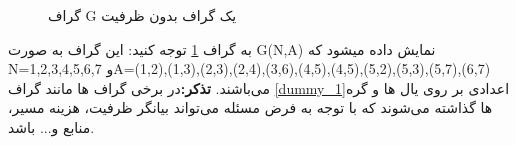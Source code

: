 {\begin{description}
\begin{figure}[t]
\caption{گراف G یک گراف بدون ظرفیت}\label{dummy_2}\end{figure}
به گراف  \ref{dummy_2} توجه کنید:
این گراف به صورت G(N,A) نمایش داده میشود که N={1,2,3,4,5,6,7} وA={(1,2),(1,3),(2,3),(2,4),(3,6),(4,5),(4,5),(5,2),(5,3),(5,7),(6,7)} می‌باشند.
\textbf{تذکر:}در برخی گراف ها مانند گراف \ref{dummy_1}اعدادی بر روی یال ها و گره ها گذاشته می‌شوند که با توجه به فرض مسئله می‌تواند بیانگر ظرفیت، هزینه مسیر، منابع و... باشد.
\end{description}


}